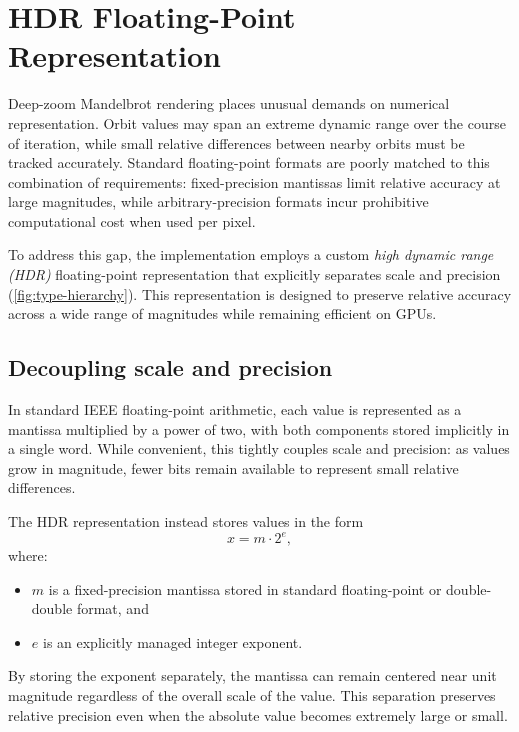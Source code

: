 \section{HDR Floating-Point Representation}
\label{sec:hdr-float}

Deep-zoom Mandelbrot rendering places unusual demands on numerical
representation. Orbit values may span an extreme dynamic range over the course
of iteration, while small relative differences between nearby orbits must be
tracked accurately. Standard floating-point formats are poorly matched to this
combination of requirements: fixed-precision mantissas limit relative accuracy
at large magnitudes, while arbitrary-precision formats incur prohibitive
computational cost when used per pixel.

To address this gap, the implementation employs a custom \emph{high dynamic range (HDR)}
floating-point representation that explicitly separates scale and precision
(\cref{fig:type-hierarchy}).
This representation is designed to preserve relative accuracy across a wide
range of magnitudes while remaining efficient on GPUs.

\subsection{Decoupling scale and precision}

In standard IEEE floating-point arithmetic, each value is represented as a
mantissa multiplied by a power of two, with both components stored implicitly in
a single word. While convenient, this tightly couples scale and precision: as
values grow in magnitude, fewer bits remain available to represent small
relative differences.

The HDR representation instead stores values in the form
\begin{equation}
x = m \cdot 2^{e},
\end{equation}
where:
\begin{itemize}
\item \(m\) is a fixed-precision mantissa stored in standard floating-point or
      double-double format, and
\item \(e\) is an explicitly managed integer exponent.
\end{itemize}

By storing the exponent separately, the mantissa can remain centered near unit
magnitude regardless of the overall scale of the value. This separation preserves relative
precision even when the absolute value becomes extremely large or small.

